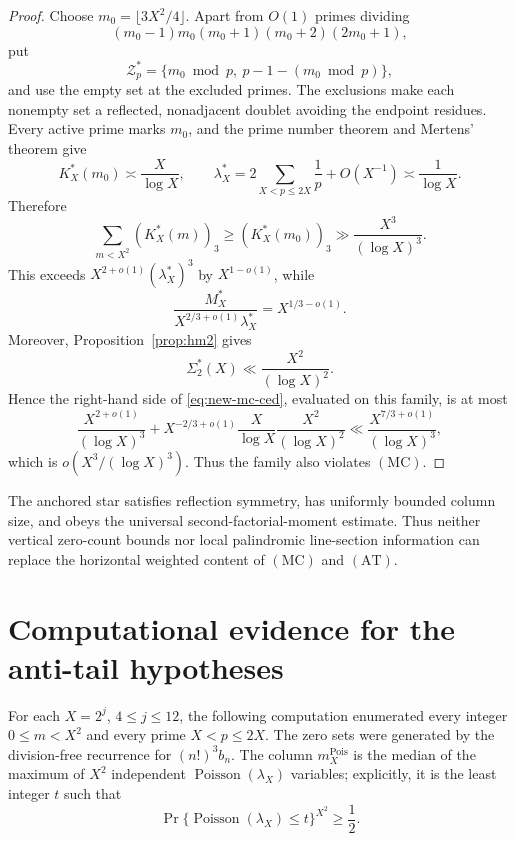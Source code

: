 \begin{proof}
Choose \(m_0=\lfloor3X^2/4\rfloor\).  Apart from \(O(1)\) primes
dividing
\[
 (m_0-1)m_0(m_0+1)(m_0+2)(2m_0+1),
\]
put
\[
 \mathcal Z_p^*
 =\{m_0\bmod p,\ p-1-(m_0\bmod p)\},
\]
and use the empty set at the excluded primes.  The exclusions make
each nonempty set a reflected, nonadjacent doublet avoiding the
endpoint residues.  Every active prime marks \(m_0\), and the prime
number theorem and Mertens' theorem give
\[
 K_X^*(m_0)\asymp\frac X{\log X},
 \qquad
 \lambda_X^*=2\sum_{X<p\le2X}\frac1p+O(X^{-1})
 \asymp\frac1{\log X}.
\]
Therefore
\[
 \sum_{m<X^2}(K_X^*(m))_3
 \ge(K_X^*(m_0))_3
 \gg\frac{X^3}{(\log X)^3}.
\]
This exceeds \(X^{2+o(1)}(\lambda_X^*)^3\) by
\(X^{1-o(1)}\), while
\[
 \frac{M_X^*}
 {X^{2/3+o(1)}\lambda_X^*}
 =X^{1/3-o(1)}.
\]
Moreover, Proposition~\ref{prop:hm2} gives
\[
 \Sigma_2^*(X)\ll\frac{X^2}{(\log X)^2}.
\]
Hence the right-hand side of \eqref{eq:new-mc-ced}, evaluated on this
family, is at most
\[
 \frac{X^{2+o(1)}}{(\log X)^3}
 +X^{-2/3+o(1)}
   \frac{X}{\log X}\frac{X^2}{(\log X)^2}
 \ll\frac{X^{7/3+o(1)}}{(\log X)^3},
\]
which is \(o(X^3/(\log X)^3)\).  Thus the family also violates
\((\mathrm{MC})\).
\end{proof}

\begin{remark}
The anchored star satisfies reflection symmetry, has uniformly bounded
column size, and obeys the universal second-factorial-moment estimate.
Thus neither vertical zero-count bounds nor local palindromic
line-section information can replace the horizontal weighted content
of \((\mathrm{MC})\) and \((\mathrm{AT})\).
\end{remark}


\section{Computational evidence for the anti-tail hypotheses}
\label{sec:anti-tail-computation}

For each \(X=2^j\), \(4\le j\le12\), the following computation
enumerated every integer \(0\le m<X^2\) and every prime
\(X<p\le2X\).  The zero sets were generated by the division-free
recurrence for \((n!)^3b_n\).  The column \(m_X^{\mathrm{Pois}}\)
is the median of the maximum of \(X^2\) independent
\(\operatorname{Poisson}(\lambda_X)\) variables; explicitly, it is
the least integer \(t\) such that
\[
 \Pr\{\operatorname{Poisson}(\lambda_X)\le t\}^{X^2}\ge\frac12.
\]

